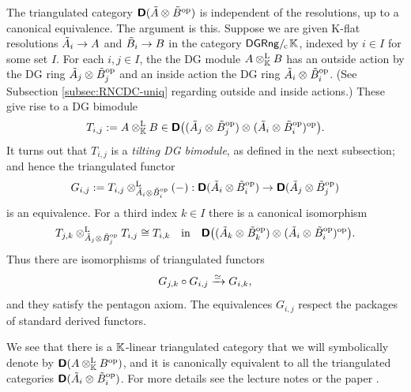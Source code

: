\begin{rem}
The triangulated category 
$\boldsymbol{\mathsf{D}}(\tilde{A} \otimes_{} \tilde{B}^{\mathrm{op}})$
is independent of the resolutions, up to a canonical equivalence.
The argument is this. 
Suppose we are given K-flat resolutions 
$\tilde{A}_i \to A$ and $\tilde{B}_i \to B$ in the category 
$\mathrm{\mathsf{DGRng}} /_{\mspace{-2mu} \mathrm{c}} \mspace{2mu} \mathbb{K}$, indexed by $i \in I$ for some set $I$. 
For each $i, j \in I$, the 
the DG module $A \otimes^{\mathrm{L}}_{\mathbb{K}} B$
has an outside action by the DG ring 
$\tilde{A}_j \otimes_{} \tilde{B}_j^{\mathrm{op}}$
and an inside action the DG ring 
$\tilde{A}_i \otimes_{} \tilde{B}_i^{\mathrm{op}}$. 
(See Subsection \ref{subsec:RNCDC-uniq} regarding outside and inside actions.)
These give rise to a DG bimodule
\[ T_{i, j} := A \otimes^{\mathrm{L}}_{\mathbb{K}} B \in 
\boldsymbol{\mathsf{D}} \bigl( (\tilde{A}_j \otimes_{} \tilde{B}_j^{\mathrm{op}}) \otimes_{}
(\tilde{A}_i \otimes_{} \tilde{B}_i^{\mathrm{op}})^{\mathrm{op}} \bigr) . \]
It turns out that $T_{i, j}$ is a {\em tilting DG bimodule}, as defined in the 
next subsection; and hence the triangulated functor
\begin{equation} \label{eqn:5090}
G_{i, j} := T_{i, j} \otimes^{\mathrm{L}}_{\tilde{A}_i \otimes \tilde{B}_i^{\mathrm{op}}} (-) :
\boldsymbol{\mathsf{D}}(\tilde{A}_i \otimes \tilde{B}_i^{\mathrm{op}}) \to
\boldsymbol{\mathsf{D}}(\tilde{A}_j \otimes \tilde{B}_j^{\mathrm{op}}) 
\end{equation}
is an equivalence. For a third index $k \in I$ there is a canonical 
isomorphism
\[ T_{j, k} \otimes^{\mathrm{L}}_{\tilde{A}_j \otimes_{} \tilde{B}_j^{\mathrm{op}}} 
T_{i, j} \cong T_{i, k} 
\quad \textup{in} \quad 
\boldsymbol{\mathsf{D}} \bigl( (\tilde{A}_k \otimes_{} \tilde{B}_k^{\mathrm{op}}) \otimes_{}
(\tilde{A}_i \otimes_{} \tilde{B}_i^{\mathrm{op}})^{\mathrm{op}} \bigr) . \]
Thus there are isomorphisms of triangulated functors 
\begin{equation} \label{eqn:3501}
G_{j, k} \circ G_{i, j} \xrightarrow{\simeq} G_{i, k} ,
\end{equation}
and they satisfy the pentagon axiom. 
The equivalences $G_{i, j}$ respect the packages of standard derived 
functors.

We see that there is a $\mathbb{K}$-linear triangulated category that we will 
symbolically denote by 
$\boldsymbol{\mathsf{D}}(A \otimes^{\mathrm{L}}_{\mathbb{K}} B^{\mathrm{op}})$,
and it is canonically equivalent to all the triangulated categories 
$\boldsymbol{\mathsf{D}}(\tilde{A}_i \otimes_{} \tilde{B}_i^{\mathrm{op}})$.
For more details see the lecture notes \cite{Ye16} 
or the paper \cite{Ye14}. 
\end{rem}

